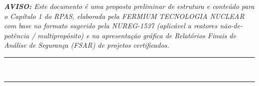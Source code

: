 \begin{center}
\begin{minipage}{0.9\textwidth}
\centering\small
\textit{\textbf{AVISO: }Este documento \'e uma proposta preliminar de estrutura e conte\'udo para o
Cap\'itulo 1 do RPAS, elaborada pela FERMIUM TECNOLOGIA NUCLEAR com base no formato sugerido
pela NUREG-1537 (aplic\'avel a reatores n\~ao-de-pot\^encia / multi\-pro\-p\'osito) e na
apresenta\c{c}\~ao gr\'afica de Relat\'orios Finais de An\'alise de Seguran\c{c}a (FSAR) de
projetos certificados.}
\end{minipage}

\vspace{0.5cm}
\rule{\textwidth}{0.6pt}\\[2pt]
\rule{\textwidth}{1.6pt}

\end{center}
\restoregeometry
\clearpage
